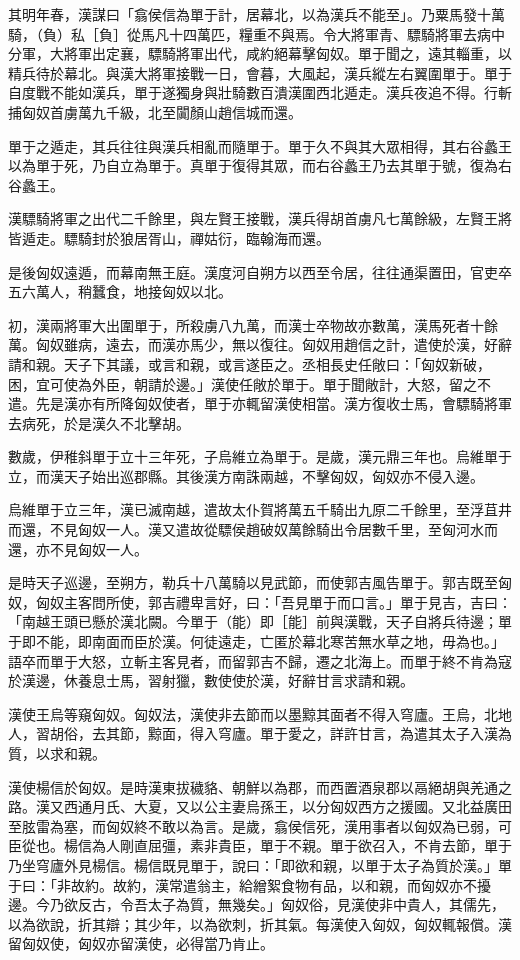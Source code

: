 \begin{pinyinscope}
其明年春，漢謀曰「翕侯信為單于計，居幕北，以為漢兵不能至」。乃粟馬發十萬騎，（負）私［負］從馬凡十四萬匹，糧重不與焉。令大將軍青、驃騎將軍去病中分軍，大將軍出定襄，驃騎將軍出代，咸約絕幕擊匈奴。單于聞之，遠其輜重，以精兵待於幕北。與漢大將軍接戰一日，會暮，大風起，漢兵縱左右翼圍單于。單于自度戰不能如漢兵，單于遂獨身與壯騎數百潰漢圍西北遁走。漢兵夜追不得。行斬捕匈奴首虜萬九千級，北至闐顏山趙信城而還。

單于之遁走，其兵往往與漢兵相亂而隨單于。單于久不與其大眾相得，其右谷蠡王以為單于死，乃自立為單于。真單于復得其眾，而右谷蠡王乃去其單于號，復為右谷蠡王。

漢驃騎將軍之出代二千餘里，與左賢王接戰，漢兵得胡首虜凡七萬餘級，左賢王將皆遁走。驃騎封於狼居胥山，禪姑衍，臨翰海而還。

是後匈奴遠遁，而幕南無王庭。漢度河自朔方以西至令居，往往通渠置田，官吏卒五六萬人，稍蠶食，地接匈奴以北。

初，漢兩將軍大出圍單于，所殺虜八九萬，而漢士卒物故亦數萬，漢馬死者十餘萬。匈奴雖病，遠去，而漢亦馬少，無以復往。匈奴用趙信之計，遣使於漢，好辭請和親。天子下其議，或言和親，或言遂臣之。丞相長史任敞曰：「匈奴新破，困，宜可使為外臣，朝請於邊。」漢使任敞於單于。單于聞敞計，大怒，留之不遣。先是漢亦有所降匈奴使者，單于亦輒留漢使相當。漢方復收士馬，會驃騎將軍去病死，於是漢久不北擊胡。

數歲，伊稚斜單于立十三年死，子烏維立為單于。是歲，漢元鼎三年也。烏維單于立，而漢天子始出巡郡縣。其後漢方南誅兩越，不擊匈奴，匈奴亦不侵入邊。

烏維單于立三年，漢已滅南越，遣故太仆賀將萬五千騎出九原二千餘里，至浮苴井而還，不見匈奴一人。漢又遣故從驃侯趙破奴萬餘騎出令居數千里，至匈河水而還，亦不見匈奴一人。

是時天子巡邊，至朔方，勒兵十八萬騎以見武節，而使郭吉風告單于。郭吉既至匈奴，匈奴主客問所使，郭吉禮卑言好，曰：「吾見單于而口言。」單于見吉，吉曰：「南越王頭已懸於漢北闕。今單于（能）即［能］前與漢戰，天子自將兵待邊；單于即不能，即南面而臣於漢。何徒遠走，亡匿於幕北寒苦無水草之地，毋為也。」語卒而單于大怒，立斬主客見者，而留郭吉不歸，遷之北海上。而單于終不肯為寇於漢邊，休養息士馬，習射獵，數使使於漢，好辭甘言求請和親。

漢使王烏等窺匈奴。匈奴法，漢使非去節而以墨黥其面者不得入穹廬。王烏，北地人，習胡俗，去其節，黥面，得入穹廬。單于愛之，詳許甘言，為遣其太子入漢為質，以求和親。

漢使楊信於匈奴。是時漢東拔穢貉、朝鮮以為郡，而西置酒泉郡以鬲絕胡與羌通之路。漢又西通月氏、大夏，又以公主妻烏孫王，以分匈奴西方之援國。又北益廣田至胘雷為塞，而匈奴終不敢以為言。是歲，翕侯信死，漢用事者以匈奴為已弱，可臣從也。楊信為人剛直屈彊，素非貴臣，單于不親。單于欲召入，不肯去節，單于乃坐穹廬外見楊信。楊信既見單于，說曰：「即欲和親，以單于太子為質於漢。」單于曰：「非故約。故約，漢常遣翁主，給繒絮食物有品，以和親，而匈奴亦不擾邊。今乃欲反古，令吾太子為質，無幾矣。」匈奴俗，見漢使非中貴人，其儒先，以為欲說，折其辯；其少年，以為欲刺，折其氣。每漢使入匈奴，匈奴輒報償。漢留匈奴使，匈奴亦留漢使，必得當乃肯止。


\end{pinyinscope}
